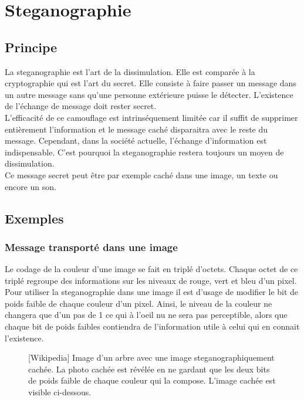 \documentclass{acm_proc_article-sp}
\begin{document}
\begin{figure}
\centering
{}
\end{figure}

\section{Steganographie}
\subsection{Principe}
La steganographie est l'art de la dissimulation. Elle est comparée à la cryptographie qui est l'art du secret. Elle consiste à faire passer un message dans un autre message sans qu'une personne extérieure puisse le détecter. L'existence de l'échange de message doit rester secret.\\
L'efficacité de ce camouflage est intrinséquement limitée car il suffit de supprimer entièrement l'information et le message caché disparaitra avec le reste du message. Cependant, dans la société actuelle, l'échange d'information est indispensable. C'est pourquoi la steganographie restera toujours un moyen de dissimulation.\\
Ce message secret peut être par exemple caché dans une image, un texte ou encore un son.

\subsection{Exemples}
\subsubsection{Message transporté dans une image}
Le codage de la couleur d'une image se fait en triplé d'octets. Chaque octet de ce triplé regroupe des informations sur les niveaux de rouge, vert et bleu d'un pixel. Pour utiliser la steganographie dans une image il est d'usage de modifier le bit de poids faible de chaque couleur d'un pixel. Ainsi, le niveau de la couleur ne changera que d'un pas de 1 ce qui à l'oeil nu ne sera pas perceptible, alors que chaque bit de poids faibles contiendra de l'information utile à celui qui en connait l'existence.

\begin{figure}
\centering
{}
\caption{[Wikipedia] Image d'un arbre avec une image steganographiquement cachée. La photo cachée est révélée en ne gardant que les deux bits de poids faible de chaque couleur qui la compose. L'image cachée est visible ci-dessous.}
\end{figure}
\end{document}
